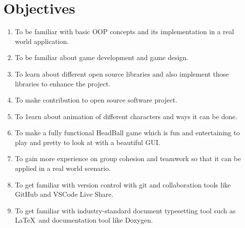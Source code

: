 \documentclass[main]{subfiles}
\begin{document}
\section{Objectives}
\begin{enumerate}
    \item To be familiar with basic OOP concepts and its implementation in a real world application.
    
    \item To be familiar about game development and game design.
    
    \item To learn about different open source libraries and also implement those libraries to enhance the project.
    
    \item To make contribution to open source software project.
    
    \item To 1earn about animation of different characters and ways it can be done.
    
    \item To make a fully functional HeadBall game which is fun and entertaining to play and pretty to look at with a beautiful GUI.
    
    \item To gain more experience on group cohesion and teamwork so that it can be applied in a real world scenario.
    
    \item To get familiar with version control with git and collaboration tools like GitHub and VSCode Live Share.
    
    \item To get familiar with industry-standard document typesetting tool such as \LaTeX\ and documentation tool like Doxygen.
\end{enumerate}
\end{document}
